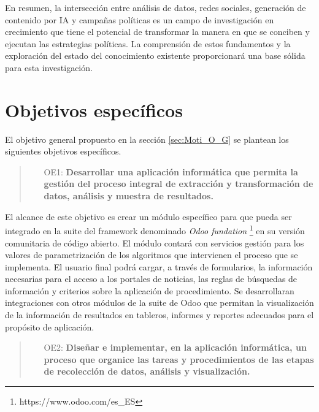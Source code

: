 \documentclass[12pt]{article}
\begin{document}
En resumen, la intersección entre análisis de datos, redes sociales, generación de contenido por IA y campañas políticas es un campo de investigación en crecimiento que tiene el potencial de transformar la manera en que se conciben y ejecutan las estrategias políticas. La comprensión de estos fundamentos y la exploración del estado del conocimiento existente proporcionará una base sólida para esta investigación.

\section{Objetivos específicos}

El objetivo general propuesto en la sección \ref{sec:Moti_O_G} se plantean los siguientes objetivos específicos. 

    \begin{quote}
    \begin{itemize}
        \item [OE1:] \textbf{Desarrollar una aplicación informática que permita la gestión del proceso integral de extracción y transformación de datos, análisis y muestra de resultados.}
    \end{itemize}
    \end{quote}

        \vspace{0.3 cm}

        El alcance de este objetivo es crear un módulo específico para que pueda ser integrado en la suite del framework denominado \textit{Odoo  fundation} \footnote{https://www.odoo.com/es\_ES} en su versión comunitaria de código abierto.
        El módulo contará con servicios gestión para los valores de parametrización de los algoritmos que intervienen el proceso que se implementa. El usuario final podrá cargar, a través de formularios, la información necesarias para el acceso a los portales de noticias, las reglas de búsquedas de información y criterios sobre la aplicación de procedimiento. Se desarrollaran integraciones con otros módulos de la suite de Odoo que permitan la visualización de la información de resultados en tableros, informes y reportes adecuados para el propósito de aplicación.

        \vspace{0.3 cm}

        \begin{quote}
            \begin{itemize}
                \item [OE2:] \textbf{Diseñar e implementar, en la aplicación informática, un proceso que organice las tareas y procedimientos de las etapas de recolección de datos, análisis y visualización.} 
             \end{itemize}
        \end{quote}
\end{document}
